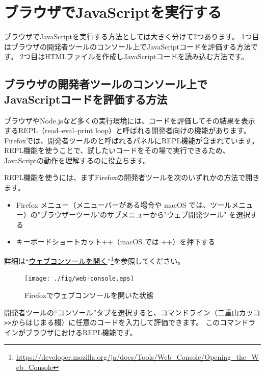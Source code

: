 \hypertarget{execute-js-on-browser}{%
\section{ブラウザでJavaScriptを実行する}\label{execute-js-on-browser}}

ブラウザでJavaScriptを実行する方法としては大きく分けて2つあります。
1つ目はブラウザの開発者ツールのコンソール上でJavaScriptコードを評価する方法です。
2つ目はHTMLファイルを作成しJavaScriptコードを読み込む方法です。

\hypertarget{repl-on-browser}{%
\subsection{ブラウザの開発者ツールのコンソール上でJavaScriptコードを評価する方法}\label{repl-on-browser}}

ブラウザやNode.jsなど多くの実行環境には、コードを評価してその結果を表示するREPL（read--eval--print
loop）と呼ばれる開発者向けの機能があります。
Firefoxでは、開発者ツールの\textbf{}と呼ばれるパネルにREPL機能が含まれています。
REPL機能を使うことで、試したいコードをその場で実行できるため、JavaScriptの動作を理解するのに役立ちます。

REPL機能を使うには、まずFirefoxの開発者ツールを次のいずれかの方法で開きます。

\begin{itemize}
\item
  Firefox メニュー（メニューバーがある場合や macOS
  では、ツールメニュー）の"ブラウザーツール"のサブメニューから"ウェブ開発ツール"
  を選択する
\item
  キーボードショートカット++（macOS では
  ++）を押下する
\end{itemize}

詳細は``\href{https://developer.mozilla.org/ja/docs/Tools/Web_Console/Opening_the_Web_Console}{ウェブコンソールを開く}''\footnote{\url{https://developer.mozilla.org/ja/docs/Tools/Web_Console/Opening_the_Web_Console}}を参照してください。

\begin{figure}[h]
\centering
\texttt{[image: ./fig/web-console.eps]}
\caption{Firefoxでウェブコンソールを開いた状態}
\end{figure}

開発者ツールの``コンソール''タブを選択すると、コマンドライン（二重山カッコ\lstinline{>>}からはじまる欄）に任意のコードを入力して評価できます。
このコマンドラインがブラウザにおけるREPL機能です。

